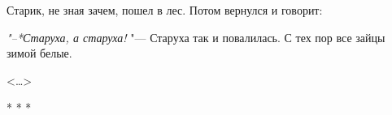 Старик, не зная зачем, пошел в лес. Потом вернулся и говорит: 

\textit{"--*Старуха, а старуха!} "--- Старуха так и повалилась. С тех пор
все зайцы зимой белые.

\begin{flushright}
<\dots{}>
\end{flushright}

\begin{center}
* * * 
\end{center}
